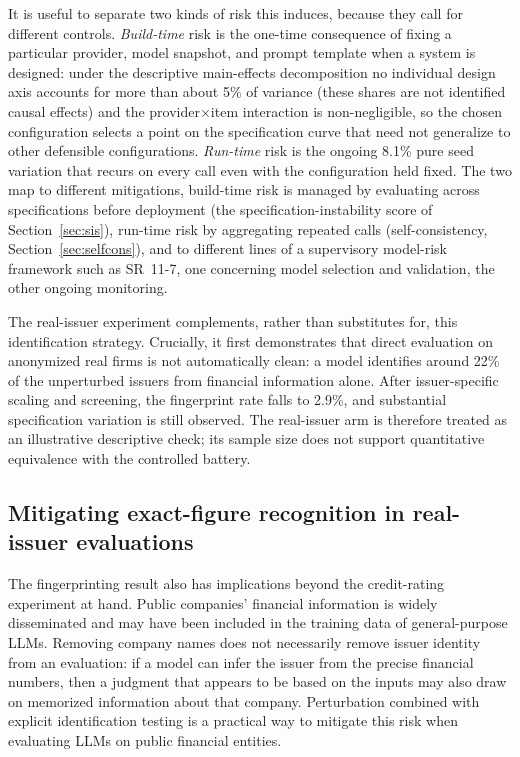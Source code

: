 \documentclass[a4paper,fleqn]{cas-sc}
\begin{document}
It is useful to separate two kinds of risk this induces, because they call for different controls.
\emph{Build-time} risk is the one-time consequence of fixing a particular provider, model snapshot, and
prompt template when a system is designed: under the descriptive main-effects decomposition no individual
design axis accounts for more than about 5\% of variance (these shares are not identified causal effects) and the
provider$\times$item interaction is non-negligible, so the chosen configuration selects a point on the
specification curve that need not generalize to other defensible configurations. \emph{Run-time} risk is
the ongoing 8.1\% pure seed variation that recurs on every call even with the configuration held fixed.
The two map to different mitigations, build-time risk is managed by evaluating across specifications
before deployment (the specification-instability score of Section~\ref{sec:sis}), run-time risk by
aggregating repeated calls (self-consistency, Section~\ref{sec:selfcons}), and to different lines of a
supervisory model-risk framework such as SR~11-7, one concerning model selection and validation, the
other ongoing monitoring.

The real-issuer experiment complements, rather than substitutes for, this identification strategy.
Crucially, it first demonstrates that direct evaluation on anonymized real firms is not automatically
clean: a model identifies around 22\% of the unperturbed issuers from financial information alone. After
issuer-specific scaling and screening, the fingerprint rate falls to 2.9\%, and substantial
specification variation is still observed. The real-issuer arm is therefore treated as an illustrative
descriptive check; its sample size does not support quantitative equivalence with the controlled battery.

\subsection{Mitigating exact-figure recognition in real-issuer evaluations}
The fingerprinting result also has implications beyond the credit-rating experiment at hand. Public
companies' financial information is widely disseminated and may have been included in the training data
of general-purpose LLMs. Removing company names does not necessarily remove issuer identity from an
evaluation: if a model can infer the issuer from the precise financial numbers, then a judgment that
appears to be based on the inputs may also draw on memorized information about that company. Perturbation
combined with explicit identification testing is a practical way to mitigate this risk when evaluating
LLMs on public financial entities.
\end{document}
